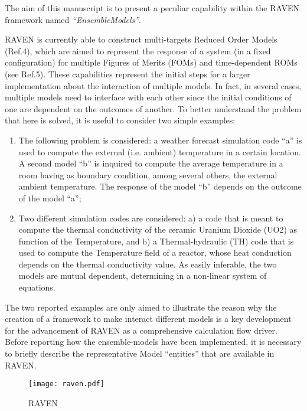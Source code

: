 The aim of this manuscript is to present a peculiar capability within the RAVEN framework named \textit{``EnsembleModels''}.

RAVEN is currently able to construct multi-targets Reduced Order Models (Ref.4), which are aimed to represent the response of a system (in a 
fixed configuration) for multiple Figures of Merits (FOMs) and time-dependent ROMs (see Ref.5). These capabilities represent the initial steps for a larger 
implementation about the interaction of multiple models. In fact, in several cases, multiple models need to interface with each other since the initial conditions of 
one are dependent on the outcomes of another.
To better understand the problem that here is solved, it is useful to consider two simple examples:
\begin{enumerate}
  \item The following problem is considered: a weather forecast simulation code ``a'' is used to compute the external (i.e. ambient) temperature in a certain location. 
  A second model ``b'' is inquired to compute the average temperature in a room having as boundary condition, among several others, the external ambient 
  temperature. The response of the model ``b'' depends on the outcome of the model ``a'';
   \item Two different simulation codes are considered: a) a code that is meant to compute the thermal conductivity of the ceramic Uranium Dioxide (UO2) as 
   function of the Temperature, and b) a Thermal-hydraulic (TH) code that is used to compute the Temperature field of a reactor, whose heat conduction depends on 
   the thermal conductivity value. As easily inferable, the two models are mutual dependent, determining in a non-linear system of equations.
\end{enumerate}
The two reported examples are only aimed to illustrate the reason why the creation of a framework to make interact different models is a key development for the 
advancement of RAVEN as a comprehensive calculation flow driver. Before reporting how the ensemble-models have been implemented, it is necessary to briefly 
describe the representative Model ``entities'' that are available in RAVEN.



\begin{figure}
    \centering
    \texttt{[image: raven.pdf]}
    \caption{RAVEN}
    \label{fig:raven}
\end{figure}
